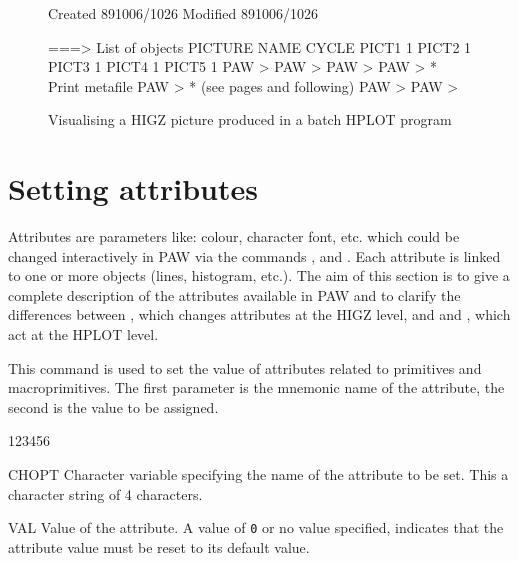 \begin{figure}[t]
\begin{minipage}[t]{.49\textwidth}
\begin{talltt}
  Created 891006/1026  Modified 891006/1026
 
===> List of objects
    PICTURE  NAME                  CYCLE
       PICT1                        1
       PICT2                        1
       PICT3                        1
       PICT4                        1
       PICT5                        1
PAW > 
PAW > 
PAW > 
PAW > * Print metafile
PAW > *  {\rm (see pages \pageref{sec:H2HIGZP} and following)}
PAW > 
PAW > 
\end{talltt}

\begin{center}\mbox{}\end{center}
\end{minipage}

\caption{Visualising a HIGZ picture produced in a batch HPLOT program}
\label{fig:HIGZBAT}
\end{figure}

\section{Setting attributes}

Attributes are parameters like: colour, character font, etc. which could be
changed interactively in PAW via the commands ,
 and . 
Each attribute is linked to one or more objects (lines, histogram, etc.). The
aim of this section is to give a complete description of the attributes 
available in PAW and to clarify the differences between , which
changes attributes at the HIGZ level, and and ,
which act at the HPLOT level.

\def\PAWchap{ }

This command is used to set the value of attributes related to primitives 
and macroprimitives. The first parameter is the mnemonic name of the attribute,
the second is the value to be assigned.

\begin{DLtt}{123456}
\item[CHOPT] Character variable specifying the name of the attribute to be set.
             This a character string of 4 characters.
\item[VAL]   Value of the attribute. A value of \texttt{0} or no value specified,
             indicates that the attribute value must be reset to its default
             value.
\end{DLtt}

